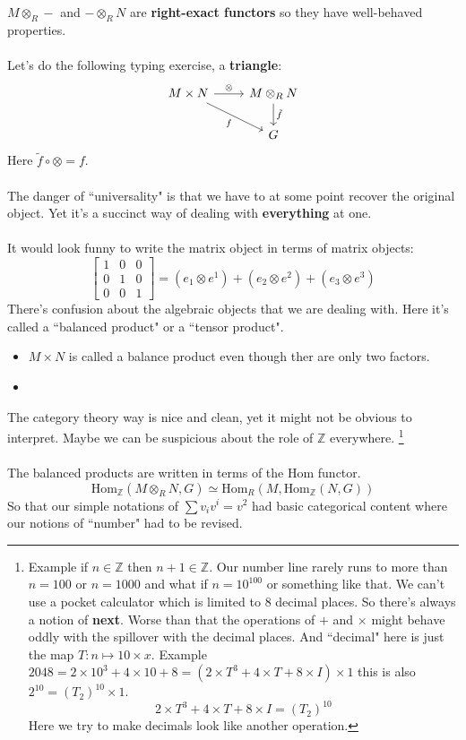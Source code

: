 \documentclass[12pt]{article}
\begin{document}
{\noindent $M \otimes_R -$ and $- \otimes_R N$ are \textbf{right-exact functors} so they have well-behaved properties.  \\ \\
Let's do the following typing exercise, a \textbf{triangle}:
\[  
\begin{tikzcd}
M \times N \arrow{r}{\otimes} \arrow[swap]{dr}{f} & M \otimes_R N \arrow{d}{\tilde{f}} \\
 & G \end{tikzcd}
\] 
Here $\tilde{f} \circ \otimes = f$. \\ \\
The danger of ``universality" is that we have to at some point recover the original object.  Yet it's a succinct way of dealing with \textbf{everything}  at one. \\ \\
It would look funny to write the matrix object in terms of matrix objects:
$$
\left[\begin{array}{ccc} 
1 & 0 & 0 \\
0 & 1 & 0 \\
0 & 0 & 1 \end{array} \right] 
= (e_1 \otimes e^1) + (e_2 \otimes e^2) + (e_3 \otimes e^3 )$$
There's confusion about the algebraic objects that we are dealing with.  Here it's called a ``balanced product" or a ``tensor product".
\begin{itemize}
	\item $M \times N$ is called a balance product even though ther are only two factors.
	\item 
\end{itemize}
The category theory way is nice and clean, yet it might not be obvious to interpret.  Maybe we can be suspicious about the role of $\mathbb{Z}$ everywhere.
\footnote{Example if $n \in \mathbb{Z}$ then $n+1 \in \mathbb{Z}$.  Our number line rarely runs to more than $n = 100$ or $n = 1000$ and what if $n = 10^{100}$ or something like that.  We can't use a pocket calculator which is limited to 8 decimal places.  So there's always a notion of \textbf{next}.  Worse than that the operations of $+$ and $\times$ might behave oddly with the spillover with the decimal places.  And ``decimal" here is just the map $T: n \mapsto 10 \times x$. Example $2048 = 2 \times 10^3 + 4 \times 10 + 8 = (2 \times T^3 + 4 \times T + 8 \times I) \times 1$ this is also $2^10 = (T_2)^{10} \times 1$.
$$ 2 \times T^3 + 4 \times T + 8 \times I = (T_2)^{10} $$
Here we try to make decimals look like another operation.} \\ \\
The balanced products are written in terms of the $\text{Hom}$ functor.
$$ \text{Hom}_\mathbb{Z} (M \otimes_R N, G) \simeq \text{Hom}_R(M, \text{Hom}_\mathbb{Z}(N, G)) $$
So that our simple notations of $\sum v_iv^i = v^2$ had basic categorical content where our notions of ``number" had to be revised.

}
\end{document}
